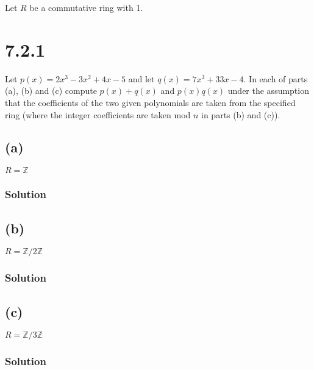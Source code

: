 \documentclass[fleqn]{article}
\begin{document}
    \break
    
    Let $R$ be a commutative ring with 1.
    
    \section{7.2.1}
    Let $p(x) = 2x^3 - 3x^2 + 4x - 5$ and let $q(x) = 7x^3 + 33x - 4$.  In each of parts (a), (b) and (c) compute $p(x) + q(x)$ and $p(x)q(x)$ under the assumption that the coefficients of the two given polynomials are taken from the specified ring (where the integer coefficients are taken mod $n$ in parts (b) and (c)).
        
        \subsection{(a)}
        $R = \mathbb{Z}$
            
            \subsubsection{Solution}
            
        
        \subsection{(b)}
        $R = \mathbb{Z}/2\mathbb{Z}$
            
            \subsubsection{Solution}
            
        
        \subsection{(c)}
        $R = \mathbb{Z}/3\mathbb{Z}$
        
            \subsubsection{Solution}
            
    
\end{document}
